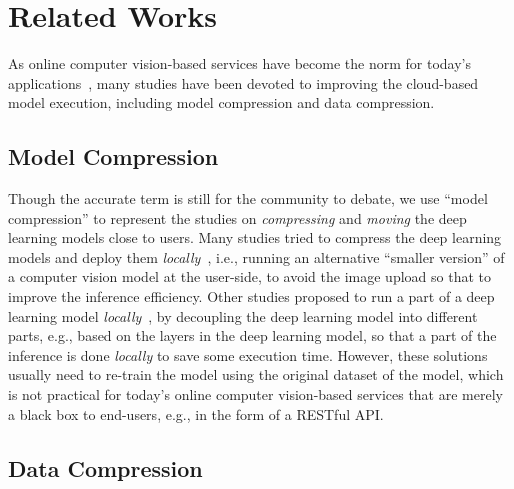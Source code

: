 \section{Related Works}
\label{Section: related_works}

As online computer vision-based services have become the norm for today's applications~\cite{huynh2017deepmon, agrawal2015cloudcv}, many studies have been devoted to improving the cloud-based model execution, including model compression and data compression.

\subsection{Model Compression}

Though the accurate term is still for the community to debate, we use ``model compression'' to represent the studies on \emph{compressing} and \emph{moving} the deep learning models close to users. Many studies tried to compress the deep learning models and deploy them \emph{locally}~\cite{prun_quanti, pruning_han, quantize, quantize_3bit, quantization, structured_pruning}, i.e., running an alternative ``smaller version'' of a computer vision model at the user-side, to avoid the image upload so that to improve the inference efficiency. Other studies proposed to run a part of a deep learning model \emph{locally}~\cite{ILP_Decoupling, jalad, Edge_LBP, Neurosurgeon}, by decoupling the deep learning model into different parts, e.g., based on the layers in the deep learning model, so that a part of the inference is done \emph{locally} to save some execution time. However, these solutions usually need to re-train the model using the original dataset of the model, which is not practical for today's online computer vision-based services that are merely a black box to end-users, e.g., in the form of a RESTful API.

\subsection{Data Compression}

